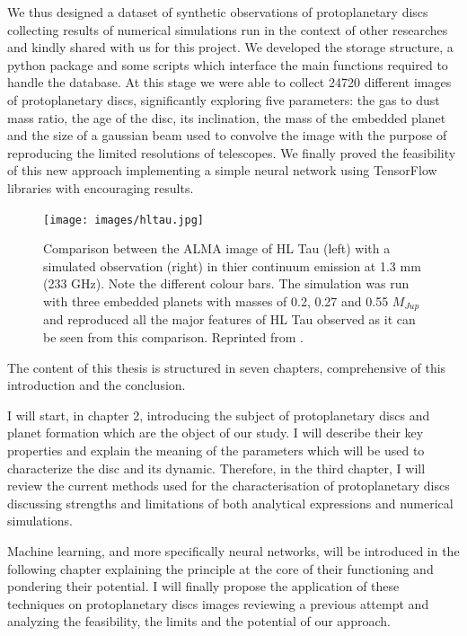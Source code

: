 \documentclass[a4paper,10pt]{report}
\begin{document}
We thus designed a dataset of synthetic observations of protoplanetary discs collecting
results of numerical simulations run in the context of other researches and kindly shared with us
for this project. We developed the storage structure, a python package and some scripts which interface 
the main functions required to handle the database. At this stage we were able to collect 24720 different images 
of protoplanetary discs, significantly exploring five parameters: the gas to dust mass ratio, the age of the disc, its inclination, the mass of
the embedded planet and the size of a 
gaussian beam used to convolve the image with the purpose of reproducing the limited resolutions
of telescopes.
We finally proved the feasibility of this new approach implementing 
a simple neural network using TensorFlow libraries with encouraging results.

\begin{figure}
    \begin{center}
        \texttt{[image: images/hltau.jpg]}
    \end{center}
    \caption{Comparison between the ALMA image of HL Tau (left) with a simulated observation (right)
    in thier continuum emission at 1.3 mm (233 GHz). Note the different colour bars.
    The simulation was run with three embedded planets with masses of 0.2, 0.27 and 0.55 $M_{Jup}$ 
    and reproduced all the major features of HL Tau observed as it can be seen from this comparison.
    Reprinted from \citet{Dipierro_2015}.}
\end{figure}

The content of this thesis is structured in seven chapters, comprehensive of this introduction and
the conclusion.

I will start, in chapter 2, introducing the subject of protoplanetary discs and planet formation which 
are the object of our study. I will describe their key properties and explain the meaning of the parameters 
which will be used to characterize the disc and its dynamic. Therefore, in the third chapter, I will review the current 
methods used for the characterisation of protoplanetary discs discussing strengths and limitations
of both analytical expressions and numerical simulations.

Machine learning, and more specifically neural networks, will 
be introduced in the following chapter explaining the principle at the core of their functioning and pondering 
their potential. I will finally propose the application of these techniques on protoplanetary discs images
reviewing a previous attempt \citep{Auddy_2020} and analyzing the feasibility, the limits and the potential of our approach.
\end{document}

